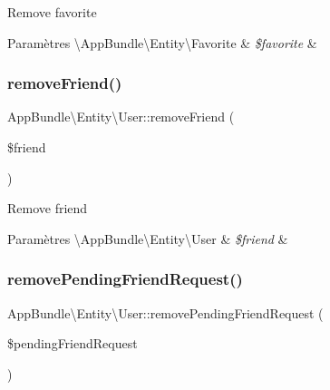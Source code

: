 Remove favorite


\begin{DoxyParams}[1]{Paramètres}
\textbackslash{}\+App\+Bundle\textbackslash{}\+Entity\textbackslash{}\+Favorite & {\em \$favorite} & \\
\hline
\end{DoxyParams}
\mbox{\label{classAppBundle_1_1Entity_1_1User_a2f11445931ce2da98849005f7818577b}} 
\subsubsection{\texorpdfstring{remove\+Friend()}{removeFriend()}}
{\footnotesize\ttfamily App\+Bundle\textbackslash{}\+Entity\textbackslash{}\+User\+::remove\+Friend (\begin{DoxyParamCaption}\item[{\hyperlink{classAppBundle_1_1Entity_1_1User}{User}}]{\$friend }\end{DoxyParamCaption})}

Remove friend


\begin{DoxyParams}[1]{Paramètres}
\textbackslash{}\+App\+Bundle\textbackslash{}\+Entity\textbackslash{}\+User & {\em \$friend} & \\
\hline
\end{DoxyParams}
\mbox{\label{classAppBundle_1_1Entity_1_1User_a551c41da5b479d91f9dadb9ae6de1ea7}} 
\subsubsection{\texorpdfstring{remove\+Pending\+Friend\+Request()}{removePendingFriendRequest()}}
{\footnotesize\ttfamily App\+Bundle\textbackslash{}\+Entity\textbackslash{}\+User\+::remove\+Pending\+Friend\+Request (\begin{DoxyParamCaption}\item[{\textbackslash{}\hyperlink{classAppBundle_1_1Entity_1_1User}{App\+Bundle\textbackslash{}\+Entity\textbackslash{}\+User}}]{\$pending\+Friend\+Request }\end{DoxyParamCaption})}

